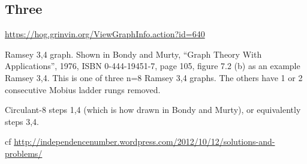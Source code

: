 \documentclass{article}
\begin{document}
\begin{center}
\end{center}

\subsection{Three}

\url{https://hog.grinvin.org/ViewGraphInfo.action?id=640}

\smallskip

Ramsey 3,4 graph.  Shown in Bondy and Murty, ``Graph Theory With
Applications'', 1976, ISBN 0-444-19451-7, page 105, figure 7.2 (b) as
an example Ramsey 3,4.  This is one of three n=8 Ramsey 3,4 graphs.
The others have 1 or 2 consecutive Mobius ladder rungs removed.

Circulant-8 steps 1,4 (which is how drawn in Bondy and Murty), or
equivalently steps 3,4.

\smallskip

cf
\url{http://independencenumber.wordpress.com/2012/10/12/solutions-and-problems/}
\end{document}
